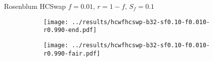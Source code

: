 \documentclass[10pt,a4paper]{beamer}
\begin{document}
%	

\begin{frame}{Rosenblum HCSwap $f=0.01,\, r=1-f,\,S_f=0.1$}
	\begin{figure}
		\begin{subfigure}{.48\textwidth}
			\centering
			\texttt{[image: ../results/hcwfhcswp-b32-sf0.10-f0.010-r0.990-end.pdf]}
		\end{subfigure}
		\begin{subfigure}{.48\textwidth}
			\centering
			\texttt{[image: ../results/hcwfhcswp-b32-sf0.10-f0.010-r0.990-fair.pdf]}
		\end{subfigure}
	\end{figure}
\end{frame}
\end{document}
